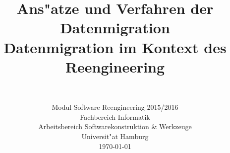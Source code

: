 \documentclass[conference]{IEEEtran}
\begin{document}
\clearpage
\thispagestyle{empty}
	
\title{Ans"atze und Verfahren der Datenmigration \\ \Large Datenmigration im Kontext des Reengineering}



\author{
	\\ 
}

\date{Modul Software Reengineering 2015/2016\\
  \small Fachbereich Informatik\\ 
  Arbeitsbereich Softwarekonstruktion \& Werkzeuge\\ 
  Universit"at Hamburg\\[4mm]
  \today}

\maketitle
\end{document}
